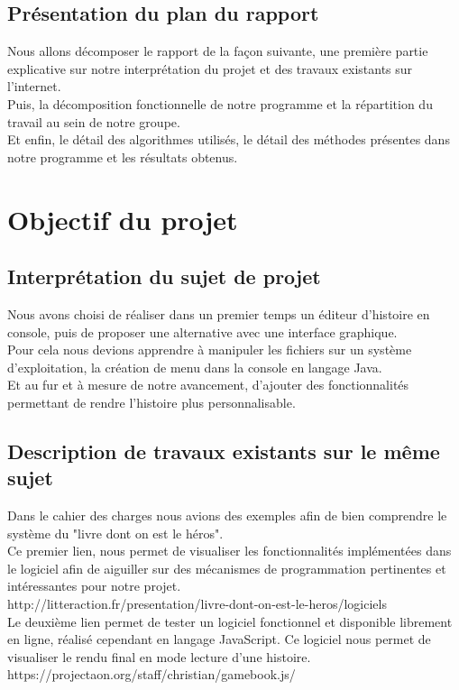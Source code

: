 \documentclass[12pt]{article}
\begin{document}
\subsection{Présentation du plan du rapport}
Nous allons décomposer le rapport de la façon suivante, une première partie explicative sur notre interprétation du projet et des travaux existants sur l'internet.\\
Puis, la décomposition fonctionnelle de notre programme et la répartition du travail au sein de notre groupe.\\
Et enfin, le détail des algorithmes utilisés, le détail des méthodes présentes dans notre programme et les résultats obtenus.


\newpage
\section{Objectif du projet}
\subsection{Interprétation du sujet de projet}
Nous avons choisi de réaliser dans un premier temps un éditeur d'histoire en console, puis de proposer une alternative avec une interface graphique.\\
Pour cela nous devions apprendre à manipuler les fichiers sur un système d'exploitation, la création de menu dans la console en langage Java.\\
Et au fur et à mesure de notre avancement, d'ajouter des fonctionnalités permettant de rendre l'histoire plus personnalisable.
\subsection{Description de travaux existants sur le même sujet	}

Dans le cahier des charges nous avions des exemples afin de bien comprendre le système du "livre dont on est le héros".\\
Ce premier lien, nous permet de visualiser les fonctionnalités implémentées dans le logiciel afin de aiguiller sur des mécanismes de programmation pertinentes et intéressantes pour notre projet.\medskip
\\
http://litteraction.fr/presentation/livre-dont-on-est-le-heros/logiciels \medskip
\\
Le deuxième lien permet de tester un logiciel fonctionnel et disponible librement en ligne, réalisé cependant en langage JavaScript. Ce logiciel nous permet de visualiser le rendu final en mode lecture d'une histoire.\medskip
\\
https://projectaon.org/staff/christian/gamebook.js/
\end{document}
